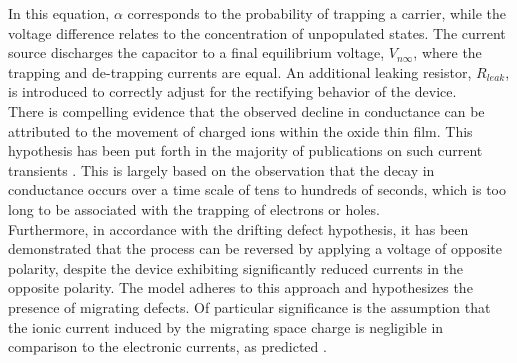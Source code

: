 \noindent In this equation, $\alpha$ corresponds to the probability of trapping a carrier, while the voltage difference relates to the concentration of unpopulated states. The current source discharges the capacitor to a final equilibrium voltage, $V_{n\infty}$, where the trapping and de-trapping currents are equal. An additional leaking resistor, $R_{leak}$, is introduced to correctly adjust for the rectifying behavior of the device.\\



\noindent There is compelling evidence that the observed decline in conductance can be attributed to the movement of charged ions within the oxide thin film. This hypothesis has been put forth in the majority of publications on such current transients \cite{wang2006oxygen}. This is largely based on the observation that the decay in conductance occurs over a time scale of tens to hundreds of seconds, which is too long to be associated with the trapping of electrons or holes. \\

\noindent Furthermore, in accordance with the drifting defect hypothesis, it has been demonstrated that the process can be reversed by applying a voltage of opposite polarity, despite the device exhibiting significantly reduced currents in the opposite polarity. The model adheres to this approach and hypothesizes the presence of migrating defects. Of particular significance is the assumption that the ionic current induced by the migrating space charge is negligible in comparison to the electronic currents, as predicted \cite{meyer2005oxygen}.\\

